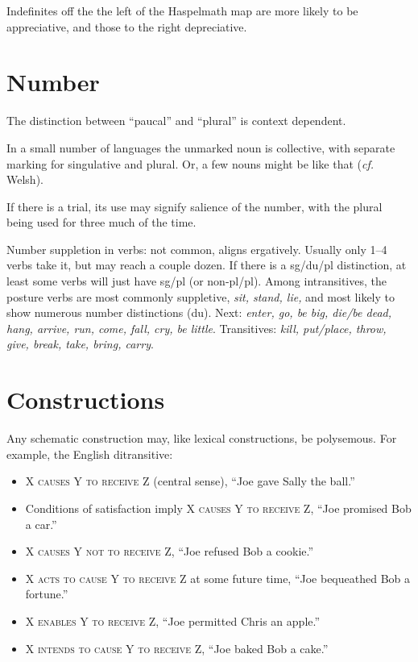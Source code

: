 \documentclass[11pt]{article}
\newcommand{\I}[1]{\textsc{#1}}   %
\newenvironment{grammarlist}%
 {\begin{itemize}\addtolength{\itemsep}{-0.5\baselineskip}\ignorespaces}%
 {\end{itemize}\ignorespacesafterend}
\begin{document}
Indefinites off the the left of the Haspelmath map are more likely to
be appreciative, and those to the right depreciative.


\section{Number}
The distinction between ``paucal'' and ``plural'' is context
dependent. 

In a small number of languages the unmarked noun is collective, with
separate marking for singulative and plural.  Or, a few nouns might be
like that (\textit{cf.} Welsh).

If there is a trial, its use may signify salience of the number, with
the plural being used for three much of the time.

Number suppletion in verbs: not common, aligns ergatively.  Usually
only 1--4 verbs take it, but may reach a couple dozen.  If there is a
sg/du/pl distinction, at least some verbs will just have sg/pl (or
non-pl/pl).  Among intransitives, the posture verbs are most commonly
suppletive, \textit{sit, stand, lie,} and most likely to show numerous
number distinctions (du).  Next: \textit{enter, go, be big, die/be
  dead, hang, arrive, run, come, fall, cry, be little}.  Transitives:
\textit{kill, put/place, throw, give, break, take, bring, carry}.


\section{Constructions}
Any schematic construction may, like lexical constructions, be
polysemous.  For example, the English ditransitive:

\begin{grammarlist}
  \item \I{X causes Y to receive Z} (central sense), ``Joe gave Sally
    the ball.''
  \item Conditions of satisfaction imply \I{X causes Y to receive Z},
    ``Joe promised Bob a car.''
  \item \I{X causes Y not to receive Z}, ``Joe refused Bob a cookie.''
  \item \I{X acts to cause Y to receive Z} at some future time, ``Joe
    bequeathed Bob a fortune.''
  \item \I{X enables Y to receive Z}, ``Joe permitted Chris an
    apple.''
  \item \I{X intends to cause Y to receive Z}, ``Joe baked Bob a cake.''
\end{grammarlist}
\end{document}
